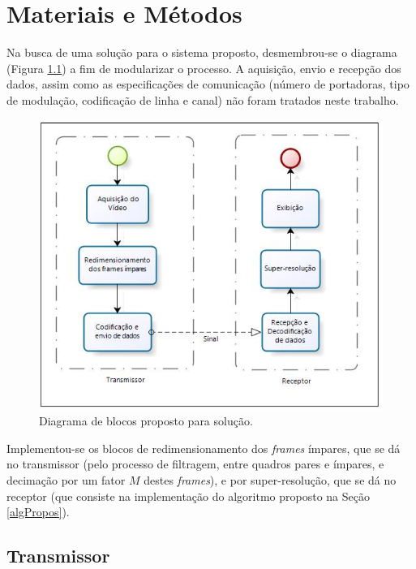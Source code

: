\chapter[Materiais e Métodos]{Materiais e Métodos}

Na busca de uma solução para o sistema proposto, desmembrou-se o diagrama (Figura \ref{fig:blocos}) a fim de modularizar o processo. A aquisição, envio e recepção dos dados, assim como as especificações de comunicação (número de portadoras, tipo de modulação, codificação de linha e canal) não foram tratados neste trabalho. 


\begin{figure}[h]
	\centering
	\includegraphics[scale=.7]{figuras/diagrama_blocos_solucao.jpg}
	\caption{Diagrama de blocos proposto para solução.}
	\label{fig:blocos}
\end{figure}

Implementou-se os blocos de redimensionamento dos \textit{frames} ímpares, que se dá no transmissor (pelo processo de filtragem, entre quadros pares e ímpares, e decimação por um fator $M$ destes \textit{frames}), e por super-resolução, que se dá no receptor (que consiste na implementação do algoritmo proposto na Seção \ref{algPropos}). 

\section{Transmissor}

